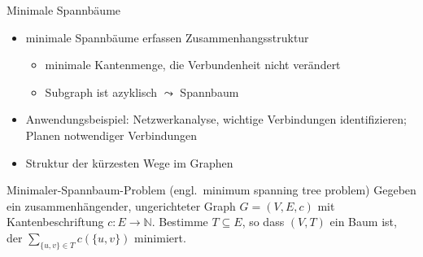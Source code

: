 \documentclass{vorlesung}
\begin{document}
\begin{frame}{Minimale Spannbäume}
\begin{center}
\end{center}
\begin{itemize}
	\item minimale Spannbäume erfassen Zusammenhangsstruktur
	\begin{itemize}
		\item minimale Kantenmenge, die Verbundenheit nicht verändert
		\item Subgraph ist azyklisch $\leadsto$ Spannbaum
	\end{itemize}
	\item Anwendungsbeispiel: Netzwerkanalyse, wichtige Verbindungen identifizieren; Planen notwendiger Verbindungen
	\item Struktur der kürzesten Wege im Graphen
\end{itemize}
\begin{block}{Minimaler-Spannbaum-Problem (engl.\ minimum spanning tree problem)}
Gegeben ein zusammenhängender, ungerichteter Graph $G=(V,E,c)$ mit Kantenbeschriftung $c:E\to \mathbb{N}$. Bestimme $T\subseteq E$, so dass $(V,T)$ ein Baum ist, der $\sum_{\{u, v\}\in T} c(\{u, v\})$ minimiert.
\end{block}
\end{frame}
%
\end{document}
